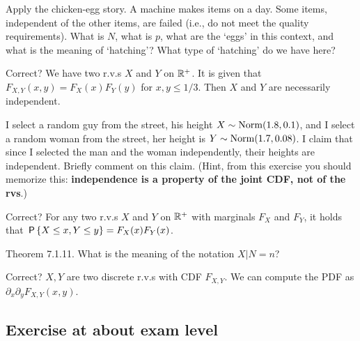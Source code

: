 \documentclass[assignments]{subfiles}
\begin{document}
\begin{exercise}
Apply the chicken-egg story.
A machine makes items on a day.
Some items, independent of the other items, are failed (i.e., do not meet the quality requirements).
What is $N$, what is $p$, what are the `eggs' in this context, and what is the meaning of `hatching'?
What type of `hatching' do we have here?
\end{exercise}



\begin{exercise}
Correct? We have two r.v.s $X$ and $Y$ on $\R^{+}$. It is given that $F_{X,Y}(x,y) = F_X(x)F_Y(y)$ for $x,y \leq 1/3$. Then  $X$ and $Y$ are necessarily independent.
\end{exercise}

\begin{exercise}
I select a random guy from the street, his height $X\sim\Norm{1.8, 0.1}$, and I select a random woman from the street, her height is $Y\sim\Norm{1.7, 0.08}$.
I claim that since I selected the man and the woman independently, their heights are independent.
Briefly comment on this claim.
(Hint, from this exercise you should memorize this: \textbf{independence is a property of the joint CDF, not of the rvs}.)
\end{exercise}


\begin{exercise}
Correct? For any two r.v.s $X$ and $Y$ on $\R^{+}$ with marginals $F_{X}$ and $F_{Y}$, it holds that $\P{X\leq x, Y\leq y} = F_{X}(x) F_{Y}(x)$.
\end{exercise}

\begin{exercise}
Theorem 7.1.11. What is the meaning of the notation $X|N=n$?
\end{exercise}

\begin{exercise}
Correct? $X, Y$ are two discrete r.v.s with CDF $F_{X,Y}$. We can compute the PDF as $\partial_{x}\partial_{y} F_{X,Y}(x,y)$.
\end{exercise}


\subsection{Exercise at about exam level}
\label{sec:below-exam-level}
\end{document}
